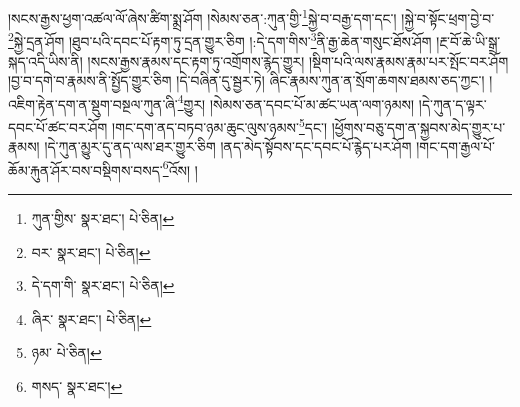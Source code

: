 །སངས་རྒྱས་ཕྱག་འཚལ་ལོ་ཞེས་ཚིག་སྨྲ་ཤོག །སེམས་ཅན་:ཀུན་གྱི་\footnote{ཀུན་གྱིས་  སྣར་ཐང་།  པེ་ཅིན། }སྐྱེ་བ་བརྒྱ་དག་དང་། །སྐྱེ་བ་སྟོང་ཕྲག་བྱེ་བ་\footnote{བར་  སྣར་ཐང་།  པེ་ཅིན། }སྐྱེ་དྲན་ཤོག །ཐུབ་པའི་དབང་པོ་རྟག་ཏུ་དྲན་གྱུར་ཅིག །:དེ་དག་གིས་\footnote{དེ་དག་གི་  སྣར་ཐང་།  པེ་ཅིན། }ནི་རྒྱ་ཆེན་གསུང་ཐོས་ཤོག །རྔ་བོ་ཆེ་ཡི་སྒྲ་སྐད་འདི་ཡིས་ནི། །སངས་རྒྱས་རྣམས་དང་རྟག་ཏུ་འགྲོགས་རྙེད་གྱུར། །སྡིག་པའི་ལས་རྣམས་རྣམ་པར་སྤོང་བར་ཤོག །བྱ་བ་དགེ་བ་རྣམས་ནི་སྤྱོད་གྱུར་ཅིག །དེ་བཞིན་དུ་སྦྱར་ཏེ། ཞིང་རྣམས་ཀུན་ན་སྲོག་ཆགས་ཐམས་ཅད་ཀྱང་། །འཇིག་རྟེན་དག་ན་སྡུག་བསྔལ་ཀུན་ཞི་\footnote{ཞིར་  སྣར་ཐང་།  པེ་ཅིན། }གྱུར། །སེམས་ཅན་དབང་པོ་མ་ཚང་ཡན་ལག་ཉམས། །དེ་ཀུན་ད་ལྟར་དབང་པོ་ཚང་བར་ཤོག །གང་དག་ནད་བཏབ་ཉམ་ཆུང་ལུས་ཉམས་\footnote{ཉམ་  པེ་ཅིན། }དང་། །ཕྱོགས་བཅུ་དག་ན་སྐྱབས་མེད་གྱུར་པ་རྣམས། །དེ་ཀུན་མྱུར་དུ་ནད་ལས་ཐར་གྱུར་ཅིག །ནད་མེད་སྟོབས་དང་དབང་པོ་རྙེད་པར་ཤོག །གང་དག་རྒྱལ་པོ་ཆོམ་རྐུན་ཤོར་བས་བསྡིགས་བསད་\footnote{གསད་  སྣར་ཐང་། }འོས། །

